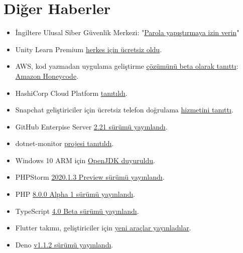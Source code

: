 \documentclass[11pt]{article}
\begin{document}
\section{Diğer Haberler}
\label{sec:orgc64e240}
\begin{itemize}
\item İngiltere Ulusal Siber Güvenlik Merkezi: "\href{https://www.ncsc.gov.uk/blog-post/let-them-paste-passwords}{Parola yapıştırmaya izin verin}"
\item Unity Learn Premium \href{https://blogs.unity3d.com/2020/06/23/learn-premium-is-now-available-to-everyone-at-no-cost-forever/}{herkes için ücretsiz oldu}.
\item AWS, kod yazmadan uygulama geliştirme \href{https://aws.amazon.com/tr/blogs/aws/introducing-amazon-honeycode-build-web-mobile-apps-without-writing-code/}{çözümünü beta olarak tanıttı}: \href{https://www.honeycode.aws}{Amazon
Honeycode}.
\item HashiCorp Cloud Platform \href{https://www.hashicorp.com/blog/announcing-cloud-platform/}{tanıtıldı}.
\item Snapchat geliştiriciler için ücretsiz telefon doğrulama \href{https://techcrunch.com/2020/06/23/snapchat-adds-free-phone-number-verification-to-its-list-of-sdk-perks/}{hizmetini tanıttı}.
\item GitHub Enterpise Server \href{https://github.blog/2020-06-25-github-enterprise-server-2-21-is-here/}{2.21 sürümü yayınlandı}.
\item dotnet-monitor \href{https://devblogs.microsoft.com/dotnet/introducing-dotnet-monitor/}{projesi tanıtıldı}.
\item Windows 10 ARM için \href{https://devblogs.microsoft.com/java/announcing-openjdk-windows-arm/}{OpenJDK duyuruldu}.
\item PHPStorm \href{https://blog.jetbrains.com/phpstorm/2020/06/phpstorm-2020-1-3-preview/}{2020.1.3 Preview sürümü yayınlandı}.
\item PHP \href{https://www.php.net/archive/2020.php\#2020-06-25-1}{8.0.0 Alpha 1 sürümü yayınlandı}.
\item TypeScript \href{https://devblogs.microsoft.com/typescript/announcing-typescript-4-0-beta/}{4.0 Beta sürümü yayınlandı}.
\item Flutter takımı, geliştiriciler için \href{https://medium.com/flutter/new-tools-for-flutter-developers-built-in-flutter-a122cb4eec86}{yeni araçlar yayınladılar}.
\item Deno \href{https://github.com/denoland/deno/releases/tag/v1.1.2}{v1.1.2 sürümü yayınlandı}.

\end{itemize}
\end{document}
